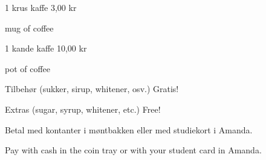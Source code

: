 \documentclass{article}
\begin{document}
1 krus kaffe \hfill 3,00 kr

{ mug of coffee}

\vspace{0.3cm}

1 kande kaffe \hfill 10,00 kr

{ pot of coffee}

\vspace{0.3cm}

Tilbehør {\large (sukker, sirup, whitener, osv.)}
\hfill Gratis!

{\english Extras \large (sugar, syrup, whitener, etc.)}
\hfill  {\english Free!}

\vspace{0.5cm}

\begin{center}
\Large\bf

Betal med kontanter i møntbakken eller med studiekort i Amanda.

{\english Pay with cash in the coin tray or with your student card in Amanda.}

\end{center}

\underskriv
\end{document}
